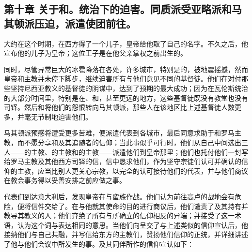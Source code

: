 
\subsection{第十章 关于和。统治下的迫害。同质派受亚略派和马其顿派压迫，派遣使团前往。}

大约在这个时期，在西方得了一个儿子，皇帝给他取了自己的名字。不久之后，他宣布他的儿子为皇帝；这位王子是在他父亲掌权之前出生的。\par

同时，尽管异常巨大的冰雹降落在各处，许多城市，特别是的，被地震摇撼，然而皇帝和主教并未停下脚步，继续迫害所有与他们意见不同的基督徒。他们在对付那些坚持尼西亚教义的基督徒的阴谋中，达到了预期的最大成功；因为在瓦伦斯统治的大部分时间里，特别是在、和，甚至更远的地方，这些基督徒既没有教堂也没有司铎。然后和将他们的怨恨转向马其顿派，那些人在该地区比上述基督徒人数更多，并毫无节制地迫害他们。\par

马其顿派预感将遭受更多苦难，便派遣代表到各城市，最后同意求助于和罗马主教，而不愿分享和及其追随者的信仰；当此事似乎可行时，他们从自己中间选出三人——的主教、的主教和的主教——派遣他们到皇帝那里；他们也托付他们一封写给罗马主教及其他西方司铎的信，信中恳求他们，作为坚守宗徒们认可并确认的信仰的主教，应当比别人更关心宗教，以完全的认可接待他们的代表，并与他们商议在教会事务得以妥善安排之前应做之事。\par

代表们到达意大利后，发现皇帝在与蛮族作战。他们认为前往高卢的战地会有危险，便将信件交给了。在与他就其使命的目的进行商议后，他们谴责了及其持有并教导其教义的人；他们弃绝了所有与所确立的信仰相反的异端；并接受了这一术语，认为这个词与表达相同的意思。当他们向呈交了与上述类似的信仰宣认后，他接纳他们与自己共融，并写信给东方的主教们，赞扬他们信仰的正统，并详细讲述了他与他们会议中所发生的事。及其同伴所作的信仰宣认如下：\par

